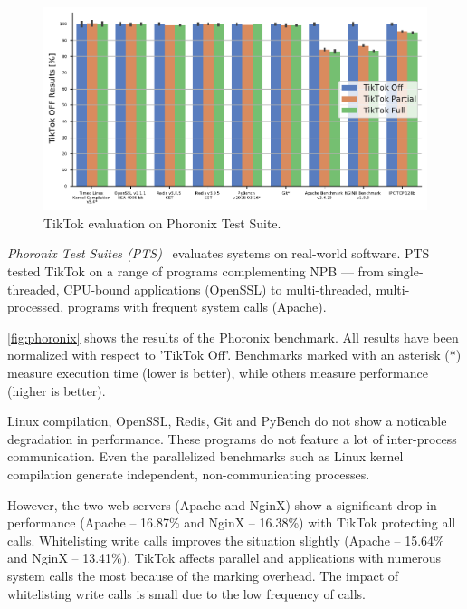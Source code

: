 \documentclass[conference]{IEEEtran}
\newcommand{\sysname}{TikTok}
\begin{document}
\begin{figure}[]
  \centering
  \includegraphics[width=\linewidth]{img/eval.pdf}
  \caption{\sysname{} evaluation on Phoronix Test Suite.
}
  \label{fig:phoronix}
\end{figure}

\emph{Phoronix Test Suites (PTS)}~\cite{pts} evaluates systems on real-world
software. PTS tested \sysname{} on a range of programs complementing NPB ---
from single-threaded, CPU-bound applications (OpenSSL) to multi-threaded,
multi-processed, programs with frequent system calls (Apache).

\autoref{fig:phoronix} shows the results of the Phoronix benchmark. All results
have been normalized with respect to '\sysname{} Off'. Benchmarks marked
with an asterisk (*) measure execution time (lower is better), while others
measure performance (higher is better).

Linux compilation, OpenSSL, Redis, Git and PyBench do not show a noticable
degradation in performance. These programs do not feature a lot of inter-process
communication. Even the parallelized benchmarks such as Linux kernel compilation
generate independent, non-communicating processes.

However, the two web servers (Apache and NginX) show a significant drop in
performance (Apache -- 16.87\% and NginX -- 16.38\%) with \sysname{} protecting
all calls. Whitelisting write calls improves the situation slightly (Apache --
15.64\% and NginX -- 13.41\%). \sysname{} affects parallel and applications with
numerous system calls the most because of the marking overhead. The impact of 
whitelisting write calls is small due to the low frequency of calls.
\end{document}
